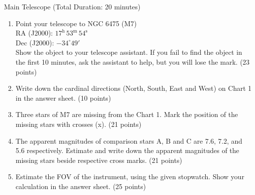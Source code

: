 Main Telescope (Total Duration: 20 minutes)

\begin{enumerate}
\item Point your telescope to NGC 6475 (M7)\\
  RA (J2000): $17^{\mathrm{h}}\,53^{\mathrm{m}}\,54^{\mathrm{s}}$\\
  Dec (J2000): $-34^\circ 49'$\\
  Show the object to your telescope assistant. If you fail to find the
  object in the first 10 minutes, ask the assistant to help, but you will
  lose the mark. \hfill(23 points)
\item Write down the cardinal directions (North, South, East and West) on
  Chart 1 in the answer sheet. \hfill(10 points)
\item Three stars of M7 are missing from the Chart 1. Mark the position of
  the missing stars with crosses (x). \hfill(21 points)
\item The apparent magnitudes of comparison stars A, B and C are 7.6, 7.2,
  and 5.6 respectively. Estimate and write down the apparent magnitudes of
  the missing stars beside respective cross marks. \hfill(21 points)
\item Estimate the FOV of the instrument, using the given stopwatch. Show
  your calculation in the answer sheet. \hfill(25 points)
\end{enumerate}

